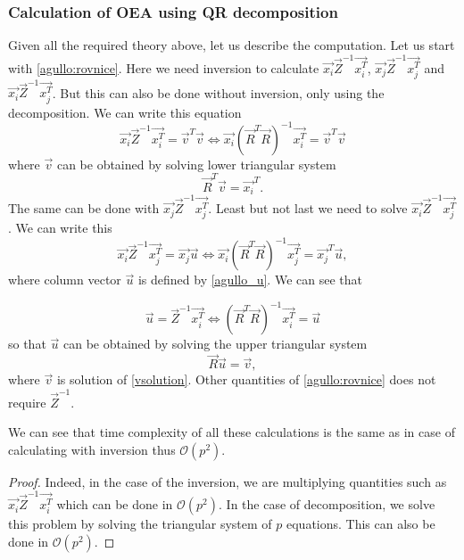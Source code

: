 \subsubsection*{Calculation of OEA using QR decomposition}
Given all the required theory above, let us describe the computation. Let us start with \eqref{agullo:rovnice}. Here we need inversion to calculate 
$\vec{x_i}\vec{Z}^{-1}\vec{x_i^T}$, $\vec{x_j}\vec{Z}^{-1}\vec{x_j^T}$ and $\vec{x_i}\vec{Z}^{-1}\vec{x_j^T}$. But this can also be done without inversion, only using the decomposition. We can write this equation
\begin{equation} \label{solveimi}
    \vec{x_i}\vec{Z}^{-1}\vec{x_i^T} = \vec{v}^T\vec{v}     \iff \vec{x_i}(\vec{R}^T\vec{R})^{-1}\vec{x_i^T} = \vec{v}^T\vec{v}
\end{equation} 
where $\vec{v}$ can be obtained by solving lower triangular system
\begin{equation} \label{vsolution}
    \vec{R}^T\vec{v} = \vec{x_i}^T.
\end{equation} 
The same can be done with  $\vec{x_j}\vec{Z}^{-1}\vec{x_j^T}$. Least but not last we need to solve 
$\vec{x_i}\vec{Z}^{-1}\vec{x_j^T}$. We can write this 
\begin{equation}
    \vec{x_i}\vec{Z}^{-1}\vec{x_j^T} = \vec{x_j}\vec{u}     \iff \vec{x_i}(\vec{R}^T\vec{R})^{-1}\vec{x_j^T} = \vec{x_j}^T\vec{u},
\end{equation} 
where column vector $\vec{u}$ is defined by \eqref{agullo_u}. We can see that 

\begin{equation}
    \vec{u} = \vec{Z}^{-1}\vec{x_i^T}     \iff (\vec{R}^T\vec{R})^{-1}\vec{x_i^T} = \vec{u}
\end{equation}
so that $\vec{u}$ can be obtained by solving the upper triangular system 
\begin{equation} \label{solve_u_qr}
    \vec{R}\vec{u} = \vec{v},
\end{equation}
where $\vec{v}$ is solution of \eqref{vsolution}. Other quantities of \eqref{agullo:rovnice} does not require $\vec{Z}^{-1}$.

\begin{observation}
We can see that time complexity of all these calculations is the same as in case of calculating with inversion thus $\mathcal{O}(p^2)$.
\end{observation}

\begin{proof}
Indeed, in the case of the inversion, we are multiplying quantities such as $\vec{x_i}\vec{Z}^{-1}\vec{x_i^T}$ which can be done in $\mathcal{O}(p^2)$.
In the case of decomposition, we solve this problem by solving the triangular system of $p$ equations. This can also be done in $\mathcal{O}(p^2)$.
\end{proof}

